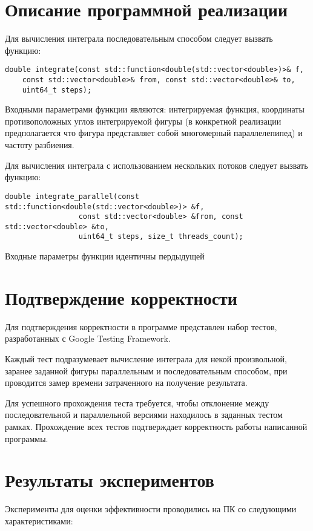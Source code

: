 \documentclass{report}
\begin{document}
\section*{Описание программной реализации}
\par Для вычисления интеграла последовательным способом следует вызвать функцию:
\begin{lstlisting}
double integrate(const std::function<double(std::vector<double>)>& f,
    const std::vector<double>& from, const std::vector<double>& to,
    uint64_t steps);
\end{lstlisting}
\par Входными параметрами функции являются: интегрируемая функция, координаты противоположных углов интегрируемой фигуры (в конкретной реализации предполагается что фигура представляет собой многомерный параллелепипед) и частоту разбиения.
\par Для вычисления интеграла с использованием нескольких потоков следует вызвать функцию:
\begin{lstlisting}
double integrate_parallel(const std::function<double(std::vector<double>)> &f,
                 const std::vector<double> &from, const std::vector<double> &to,
                 uint64_t steps, size_t threads_count);
\end{lstlisting}
\par Входные параметры функции идентичны пердыдущей

\newpage

\section*{Подтверждение корректности}
Для подтверждения корректности в программе представлен набор тестов, разработанных с Google Testing Framework.
\par Каждый тест подразумевает вычисление интеграла для некой произвольной, заранее заданной фигуры параллельным и последовательным способом, при проводится замер времени затраченного на получение результата.
\par Для успешного прохождения теста требуется, чтобы отклонение между последовательной и параллельной версиями находилось в заданных тестом рамках. Прохождение всех тестов подтверждает корректность работы написанной программы.
\newpage

\section*{Результаты экспериментов}
Эксперименты для оценки эффективности проводились на ПК со следующими характеристиками:
\end{document}
